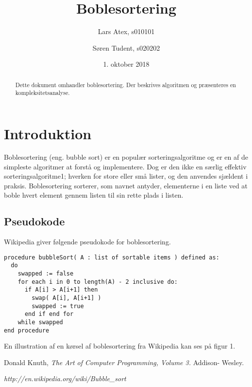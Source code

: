 \documentclass[12pt,a4paper]{article}
\begin{document}
\title{Boblesortering}
\author{
   Lars Atex, s010101
   \and
   Søren Tudent, s020202}
\date{1. oktober 2018}
\maketitle

\begin{abstract}
Dette dokument omhandler boblesortering. Der beskrives algoritmen og præsenteres en kompleksitetsanalyse.
\end{abstract}

\section{Introduktion}
Boblesortering (eng. bubble sort) er en populær sorteringsalgoritme og er en af de simpleste algoritmer at forstå og implementere. Dog er den ikke en særlig effektiv sorteringsalgoritme1; hverken for store eller små lister, og den anvendes sjældent i praksis. Boblesortering sorterer, som navnet antyder, elementerne i en liste ved at boble hvert element gennem listen til sin rette plads i listen.

\subsection{Pseudokode}
Wikipedia \cite{2} giver følgende pseudokode for boblesortering.

\begin{verbatim}
procedure bubbleSort( A : list of sortable items ) defined as:
  do
    swapped := false
    for each i in 0 to length(A) - 2 inclusive do:
      if A[i] > A[i+1] then
        swap( A[i], A[i+1] )
        swapped := true
      end if end for
    while swapped
end procedure
\end{verbatim}
En illustration af en kørsel af boblesortering fra Wikipedia kan ses på figur 1.





\begin{thebibliography}{2}

 Donald Knuth,
 \textit{The Art of Computer Programming, Volume 3.}
 Addison- Wesley.

 \textit{http://en.wikipedia.org/wiki/Bubble_sort}

\end{thebibliography}
\end{document}
